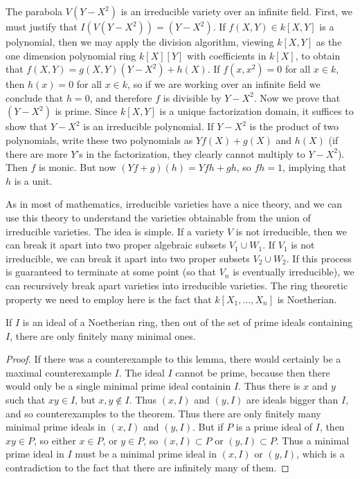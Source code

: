 \begin{example}
    The parabola $V(Y - X^2)$ is an irreducible variety over an infinite field. First, we must justify that $I(V(Y - X^2)) = (Y - X^2)$. If $f(X,Y) \in k[X,Y]$ is a polynomial, then we may apply the division algorithm, viewing $k[X,Y]$ as the one dimension polynomial ring $k[X][Y]$ with coefficients in $k[X]$, to obtain that $f(X,Y) = g(X,Y) (Y - X^2) + h(X)$. If $f(x,x^2) = 0$ for all $x \in k$, then $h(x) = 0$ for all $x \in k$, so if we are working over an infinite field we conclude that $h = 0$, and therefore $f$ is divisible by $Y - X^2$. Now we prove that $(Y - X^2)$ is prime. Since $k[X,Y]$ is a unique factorization domain, it suffices to show that $Y - X^2$ is an irreducible polynomial. If $Y - X^2$ is the product of two polynomials, write these two polynomials as $Yf(X) + g(X)$ and $h(X)$ (if there are more $Y$'s in the factorization, they clearly cannot multiply to $Y - X^2$). Then $f$ is monic. But now $(Yf + g)(h) = Yfh + gh$, so $fh = 1$, implying that $h$ is a unit.
\end{example}

As in most of mathematics, irreducible varieties have a nice theory, and we can use this theory to understand the varieties obtainable from the union of irreducible varieties. The idea is simple. If a variety $V$ is not irreducible, then we can break it apart into two proper algebraic subsets $V_1 \cup W_1$. If $V_1$ is not irreducible, we can break it apart into two proper subsets $V_2 \cup W_2$. If this process is guaranteed to terminate at some point (so that $V_n$ is eventually irreducible), we can recursively break apart varieties into irreducible varieties. The ring theoretic property we need to employ here is the fact that $k[X_1, \dots, X_n]$ is Noetherian.

\begin{lemma}
    If $I$ is an ideal of a Noetherian ring, then out of the set of prime ideals containing $I$, there are only finitely many minimal ones.
\end{lemma}
\begin{proof}
    If there was a counterexample to this lemma, there would certainly be a maximal counterexample $I$. The ideal $I$ cannot be prime, because then there would only be a single minimal prime ideal containin $I$. Thus there is $x$ and $y$ such that $xy \in I$, but $x, y \not \in I$. Thus $(x,I)$ and $(y,I)$ are ideals bigger than $I$, and so counterexamples to the theorem. Thus there are only finitely many minimal prime ideals in $(x,I)$ and $(y,I)$. But if $P$ is a prime ideal of $I$, then $xy \in P$, so either $x \in P$, or $y \in P$, so $(x,I) \subset P$ or $(y,I) \subset P$. Thus a minimal prime ideal in $I$ must be a minimal prime ideal in $(x,I)$ or $(y,I)$, which is a contradiction to the fact that there are infinitely many of them.
\end{proof}

